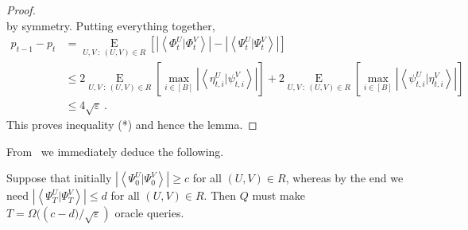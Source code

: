 \begin{proof}
\[\]
by symmetry. Putting everything together,%
\begin{align*}
p_{t-1}-p_{t}  &  =\operatorname*{E}_{U,V~:~\left(  U,V\right)  \in R}\left[
\left\vert \left\langle \Phi_{t}^{U}|\Phi_{t}^{V}\right\rangle \right\vert
-\left\vert \left\langle \Psi_{t}^{U}|\Psi_{t}^{V}\right\rangle \right\vert
\right] \\
&  \leq2\operatorname*{E}_{U,V~:~\left(  U,V\right)  \in R}\left[  \max
_{i\in\left[  B\right]  }\left\vert \left\langle \eta_{t,i}^{U}|\psi_{t,i}%
^{V}\right\rangle \right\vert \right]  +2\operatorname*{E}_{U,V~:~\left(
U,V\right)  \in R}\left[  \max_{i\in\left[  B\right]  }\left\vert \left\langle
\psi_{t,i}^{U}|\eta_{t,i}^{V}\right\rangle \right\vert \right] \\
&  \leq4\sqrt{\varepsilon}\,.
\end{align*}
This proves inequality (*) and hence the lemma.
\end{proof}

{}From \ we immediately deduce the following.

\begin{theorem}
\label{lbthm}Suppose that initially
$\left\vert \left\langle \Psi_{0}^{U}|\Psi_{0}^{V}\right\rangle \right\vert
\geq c$ for all $\left(  U,V\right)  \in R$, whereas by the end we need
$\left\vert \left\langle \Psi_{T}^{U}|\Psi_{T}^{V}\right\rangle \right\vert
\leq d$ for all $\left(  U,V\right)  \in R$. Then $Q$ must make
$T=\Omega(({c-d)}/{\sqrt{\varepsilon}})  $ oracle queries.
\end{theorem}
